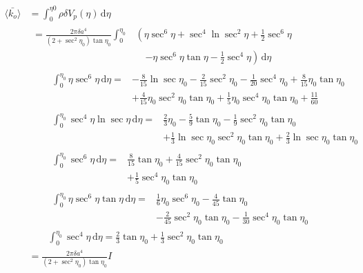\documentclass[12pt]{article}
\begin{document}
\begin{align}
\langle\bar{k_o}\rangle &= \int_0^{\eta0} \! \rho\delta V_p(\eta)\,\mathrm d\eta \\
  &\begin{aligned}
    = \frac{2\pi\delta a^4}{(2+\sec^2\eta_0)\tan\eta_0} \int_0^{\eta_0} &\left(\eta\sec^6\eta + \sec^4\ln\sec^2\eta + \frac{1}{2}\sec^6\eta \right. \\ 
    & \quad \left. - \eta\sec^6\eta\tan\eta - \frac{1}{2}\sec^4\eta\right)\,\mathrm d\eta
  \end{aligned} \\
  &\qquad\begin{aligned}
    \int_0^{\eta_0}\! \eta\sec^6\eta\,\mathrm d\eta = &-\frac{8}{15}\ln\sec\eta_0 - \frac{2}{15}\sec^2\eta_0 - \frac{1}{20}\sec^4\eta_0 + \frac{8}{15}\eta_0\tan\eta_0 \\ 
    & + \frac{4}{15}\eta_0\sec^2\eta_0\tan\eta_0 + \frac{1}{5}\eta_0\sec^4\eta_0\tan\eta_0 + \frac{11}{60}
  \end{aligned} \\
  &\qquad\begin{aligned}
    \int_0^{\eta_0} \! \sec^4\eta\ln\sec\eta\,\mathrm d\eta = &\frac{2}{3}\eta_0 - \frac{5}{9}\tan\eta_0 - \frac{1}{9}\sec^2\eta_0\tan\eta_0 \\
    & + \frac{1}{3}\ln\sec\eta_0\sec^2\eta_0\tan\eta_0 + \frac{2}{3}\ln\sec\eta_0\tan\eta_0
  \end{aligned} \\
  &\qquad\begin{aligned}
    \int_0^{\eta_0} \! \sec^6\eta\,\mathrm d\eta = &\frac{8}{15}\tan\eta_0 + \frac{4}{15}\sec^2\eta_0\tan\eta_0 \\ 
    & + \frac{1}{5}\sec^4\eta_0\tan\eta_0
  \end{aligned} \\
  &\qquad\begin{aligned}
    \int_0^{\eta_0} \! \eta\sec^6\eta\tan\eta\,\mathrm d\eta = &\frac{1}{6}\eta_0\sec^6\eta_0 - \frac{4}{45}\tan\eta_0 \\ 
    & - \frac{2}{45}\sec^2\eta_0\tan\eta_0 - \frac{1}{30}\sec^4\eta_0\tan\eta_0
  \end{aligned} \\
  &\qquad\int_0^{\eta_0} \! \sec^4\eta\,\mathrm d\eta = \frac{2}{3}\tan\eta_0 + \frac{1}{3}\sec^2\eta_0\tan\eta_0 \\
  &= \frac{2\pi\delta a^4}{\left(2+\sec^2\eta_0\right)\tan\eta_0}I
\end{align}
\end{document}
